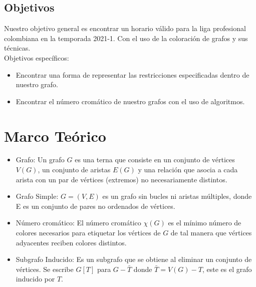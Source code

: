\documentclass[11pt]{article}
\begin{document}
\begin{multicols}{2}
            \subsection{Objetivos}
                Nuestro objetivo general es encontrar un horario válido para la liga profesional colombiana en la temporada 2021-1. Con el uso de la coloración 
                de grafos y sus técnicas.\\[10pt]
                Objetivos específicos:
                \begin{itemize}
                    \item Encontrar una forma de representar las restricciones especificadas dentro de nuestro grafo. 
                    \item Encontrar el número cromático de nuestro grafos con el uso de algoritmos.
                \end{itemize}

        \section{Marco Teórico}

            \begin{itemize}
                \item Grafo: Un grafo $G$ es una terna que consiste en un conjunto de vértices $V(G)$, un conjunto 
                de aristas $E(G)$ y una relación que asocia a cada arista con un par de vértices (extremos) 
                no necesariamente distintos.
                \item Grafo Simple: $G = (V,E)$ es un grafo sin bucles ni aristas múltiples, donde E es un conjunto 
                de pares no ordenados de vértices.
                \item Número cromático: El número cromático $\chi(G)$ es el mínimo número de colores necesarios 
                para etiquetar los vértices de $G$ de tal manera que vértices adyacentes reciben colores 
                distintos.
                \item Subgrafo Inducido: Es un subgrafo que se obtiene al eliminar un conjunto de vértices. Se 
                escribe $G[T]$ para $G-\bar{T}$ donde $\bar{T} = V(G) - T$, este es el grafo inducido por $T$.                 
            \end{itemize}
        

\end{multicols}
\end{document}

